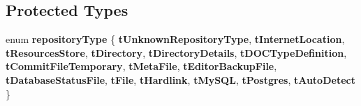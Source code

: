 \subsection*{\-Protected \-Types}
\begin{DoxyCompactItemize}
\item 
enum {\bfseries repository\-Type} \{ \*
{\bfseries t\-Unknown\-Repository\-Type}, 
{\bfseries t\-Internet\-Location}, 
{\bfseries t\-Resources\-Store}, 
{\bfseries t\-Directory}, 
\*
{\bfseries t\-Directory\-Details}, 
{\bfseries t\-D\-O\-C\-Type\-Definition}, 
{\bfseries t\-Commit\-File\-Temporary}, 
{\bfseries t\-Meta\-File}, 
\*
{\bfseries t\-Editor\-Backup\-File}, 
{\bfseries t\-Database\-Status\-File}, 
{\bfseries t\-File}, 
{\bfseries t\-Hardlink}, 
\*
{\bfseries t\-My\-S\-Q\-L}, 
{\bfseries t\-Postgres}, 
{\bfseries t\-Auto\-Detect}
 \}
\end{DoxyCompactItemize}
